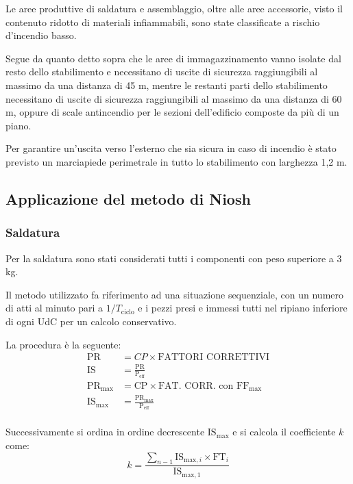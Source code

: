 \documentclass[11pt]{article}
\begin{document}
Le aree produttive di saldatura e assemblaggio, oltre alle aree accessorie, visto il contenuto ridotto di materiali infiammabili, sono state classificate a rischio d'incendio basso.

Segue da quanto detto sopra che le aree di immagazzinamento vanno isolate dal resto dello stabilimento e necessitano di uscite di sicurezza raggiungibili al massimo da una distanza di 45 m, mentre le restanti parti dello stabilimento necessitano di uscite di sicurezza raggiungibili al massimo da una distanza di 60 m, oppure di scale antincendio per le sezioni dell'edificio composte da più di un piano.

Per garantire un'uscita verso l'esterno che sia sicura in caso di incendio è stato previsto un marciapiede perimetrale in tutto lo stabilimento con larghezza 1,2 m.
\newpage

\subsection{Applicazione del metodo di Niosh}
\subsubsection{Saldatura}
Per la saldatura sono stati considerati tutti i componenti con peso superiore a 3 kg.

Il metodo utilizzato fa riferimento ad una situazione sequenziale, con un numero di atti al minuto pari a \(1/T_\text{ciclo}\) e i pezzi presi e immessi tutti nel ripiano inferiore di ogni UdC per un calcolo conservativo.

La procedura è la seguente:
\begin{align*}
    \text{PR} &= CP \times \text{FATTORI CORRETTIVI} \\
    \text{IS} &= \frac{\text{PR}}{\text{P}_\text{eff}} \\
    \text{PR}_\text{max} &= \text{CP} \times \text{FAT. CORR. con FF}_\text{max} \\
    \text{IS}_\text{max} &= \frac{\text{PR}_\text{max}}{\text{P}_\text{eff}} \\
\end{align*}

Successivamente si ordina in ordine decrescente \(\text{IS}_\text{max}\) e si calcola il coefficiente \(k\) come:
\begin{equation}
    k = \frac{\sum_{n-1} \text{IS}_{\text{max}, i} \times \text{FT}_i}{\text{IS}_{\text{max}, 1}}
\end{equation}
\end{document}

